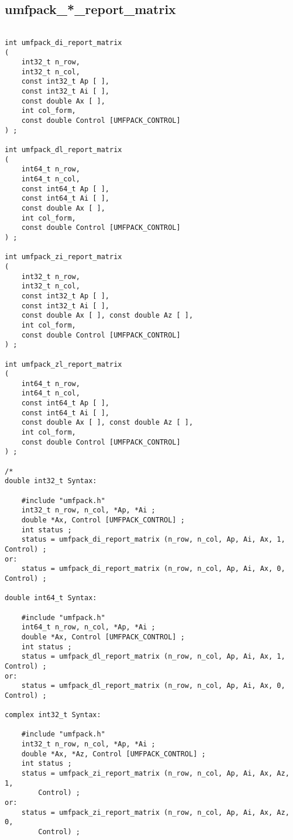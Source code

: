 \documentclass[11pt]{article}
\begin{document}
\newpage
\subsection{umfpack\_*\_report\_matrix}

{\footnotesize
\begin{verbatim}

int umfpack_di_report_matrix
(
    int32_t n_row,
    int32_t n_col,
    const int32_t Ap [ ],
    const int32_t Ai [ ],
    const double Ax [ ],
    int col_form,
    const double Control [UMFPACK_CONTROL]
) ;

int umfpack_dl_report_matrix
(
    int64_t n_row,
    int64_t n_col,
    const int64_t Ap [ ],
    const int64_t Ai [ ],
    const double Ax [ ],
    int col_form,
    const double Control [UMFPACK_CONTROL]
) ;

int umfpack_zi_report_matrix
(
    int32_t n_row,
    int32_t n_col,
    const int32_t Ap [ ],
    const int32_t Ai [ ],
    const double Ax [ ], const double Az [ ],
    int col_form,
    const double Control [UMFPACK_CONTROL]
) ;

int umfpack_zl_report_matrix
(
    int64_t n_row,
    int64_t n_col,
    const int64_t Ap [ ],
    const int64_t Ai [ ],
    const double Ax [ ], const double Az [ ],
    int col_form,
    const double Control [UMFPACK_CONTROL]
) ;

/*
double int32_t Syntax:

    #include "umfpack.h"
    int32_t n_row, n_col, *Ap, *Ai ;
    double *Ax, Control [UMFPACK_CONTROL] ;
    int status ;
    status = umfpack_di_report_matrix (n_row, n_col, Ap, Ai, Ax, 1, Control) ;
or:
    status = umfpack_di_report_matrix (n_row, n_col, Ap, Ai, Ax, 0, Control) ;

double int64_t Syntax:

    #include "umfpack.h"
    int64_t n_row, n_col, *Ap, *Ai ;
    double *Ax, Control [UMFPACK_CONTROL] ;
    int status ;
    status = umfpack_dl_report_matrix (n_row, n_col, Ap, Ai, Ax, 1, Control) ;
or:
    status = umfpack_dl_report_matrix (n_row, n_col, Ap, Ai, Ax, 0, Control) ;

complex int32_t Syntax:

    #include "umfpack.h"
    int32_t n_row, n_col, *Ap, *Ai ;
    double *Ax, *Az, Control [UMFPACK_CONTROL] ;
    int status ;
    status = umfpack_zi_report_matrix (n_row, n_col, Ap, Ai, Ax, Az, 1,
        Control) ;
or:
    status = umfpack_zi_report_matrix (n_row, n_col, Ap, Ai, Ax, Az, 0,
        Control) ;


\end{verbatim}}
\end{document}
